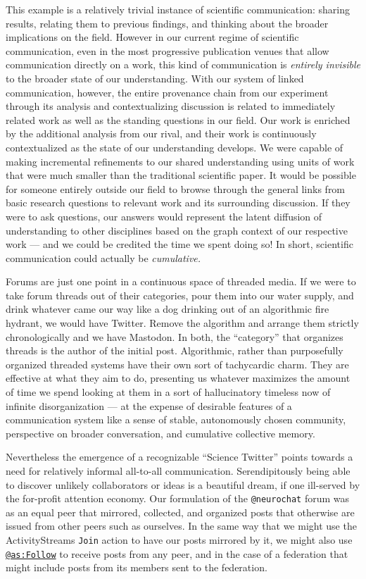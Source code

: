 This example is a relatively trivial instance of scientific
communication: sharing results, relating them to previous findings, and
thinking about the broader implications on the field. However in our
current regime of scientific communication, even in the most progressive
publication venues that allow communication directly on a work, this
kind of communication is \emph{entirely invisible} to the broader state
of our understanding. With our system of linked communication, however,
the entire provenance chain from our experiment through its analysis and
contextualizing discussion is related to immediately related work as
well as the standing questions in our field. Our work is enriched by the
additional analysis from our rival, and their work is continuously
contextualized as the state of our understanding develops. We were
capable of making incremental refinements to our shared understanding
using units of work that were much smaller than the traditional
scientific paper. It would be possible for someone entirely outside our
field to browse through the general links from basic research questions
to relevant work and its surrounding discussion. If they were to ask
questions, our answers would represent the latent diffusion of
understanding to other disciplines based on the graph context of our
respective work --- and we could be credited the time we spent doing so!
In short, scientific communication could actually be \emph{cumulative.}

Forums are just one point in a continuous space of threaded media. If we
were to take forum threads out of their categories, pour them into our
water supply, and drink whatever came our way like a dog drinking out of
an algorithmic fire hydrant, we would have Twitter. Remove the algorithm
and arrange them strictly chronologically and we have Mastodon. In both,
the ``category'' that organizes threads is the author of the initial
post. Algorithmic, rather than purposefully organized threaded systems
have their own sort of tachycardic charm. They are effective at what
they aim to do, presenting us whatever maximizes the amount of time we
spend looking at them in a sort of hallucinatory timeless now of
infinite disorganization --- at the expense of desirable features of a
communication system like a sense of stable, autonomously chosen
community, perspective on broader conversation, and cumulative
collective memory.

Nevertheless the emergence of a recognizable ``Science Twitter'' points
towards a need for relatively informal all-to-all communication.
Serendipitously being able to discover unlikely collaborators or ideas
is a beautiful dream, if one ill-served by the for-profit attention
economy. Our formulation of the \texttt{@neurochat} forum was as an
equal peer that mirrored, collected, and organized posts that otherwise
are issued from other peers such as ourselves. In the same way that we
might use the ActivityStreams \texttt{Join} action to have our posts
mirrored by it, we might also use
\href{https://www.w3.org/TR/activitystreams-vocabulary/\#dfn-follow}{\texttt{@as:Follow}}
to receive posts from any peer, and in the case of a federation that
might include posts from its members sent to the federation.

